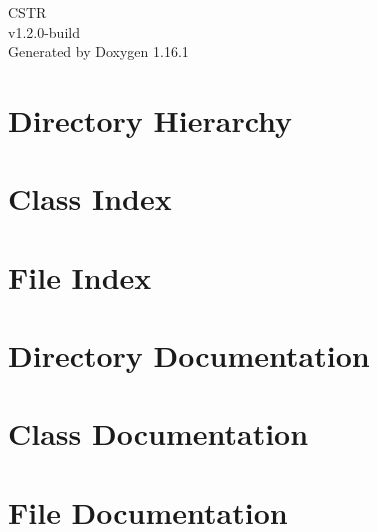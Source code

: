 \documentclass[twoside]{book}
\newcommand{\+}{\discretionary{\mbox{\scriptsize$\hookleftarrow$}}{}{}}
\newcommand{\clearemptydoublepage}{%
    \newpage{\pagestyle{empty}\cleardoublepage}%
  }
\begin{document}
  \raggedbottom
    \hypersetup{pageanchor=false,
                bookmarksnumbered=true,
                pdfencoding=unicode
               }
  \begin{titlepage}
  \vspace*{7cm}
  \begin{center}%
  {\Large CSTR}\\
  [1ex]\large v1.\+2.\+0-\/build \\
  \vspace*{1cm}
  {\large Generated by Doxygen 1.16.1}\\
  \end{center}
  \end{titlepage}
  \clearemptydoublepage
  \tableofcontents
  \clearemptydoublepage
  \hypersetup{pageanchor=true}

\chapter{Directory Hierarchy}

\chapter{Class Index}

\chapter{File Index}

\chapter{Directory Documentation}


\chapter{Class Documentation}

\chapter{File Documentation}





  \backmatter
  \newpage
  \clearemptydoublepage
  \printindex
\end{document}
